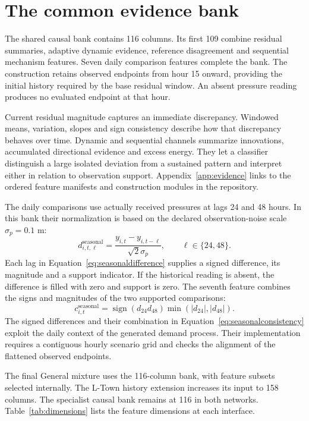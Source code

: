 \section{The common evidence bank}
The shared causal bank contains 116 columns. Its first 109 combine residual summaries, adaptive dynamic evidence, reference disagreement and sequential mechanism features. Seven daily comparison features complete the bank. The construction retains observed endpoints from hour 15 onward, providing the initial history required by the base residual window. An absent pressure reading produces no evaluated endpoint at that hour.

Current residual magnitude captures an immediate discrepancy. Windowed means, variation, slopes and sign consistency describe how that discrepancy behaves over time. Dynamic and sequential channels summarize innovations, accumulated directional evidence and excess energy. They let a classifier distinguish a large isolated deviation from a sustained pattern and interpret either in relation to observation support. Appendix~\ref{app:evidence} links to the ordered feature manifests and construction modules in the repository.

The daily comparisons use actually received pressures at lags 24 and 48 hours. In this bank their normalization is based on the declared observation-noise scale $\sigma_p=0.1$ m:
\begin{equation}
 d^{\mathrm{seasonal}}_{i,t,\ell}=
 \frac{y_{i,t}-y_{i,t-\ell}}{\sqrt{2}\sigma_p},
 \qquad \ell\in\{24,48\}.\label{eq:seasonaldifference}
\end{equation}
Each lag in Equation~\eqref{eq:seasonaldifference} supplies a signed difference, its magnitude and a support indicator. If the historical reading is absent, the difference is filled with zero and support is zero. The seventh feature combines the signs and magnitudes of the two supported comparisons:
\begin{equation}
 c^{\mathrm{seasonal}}_{i,t}=\operatorname{sign}(d_{24}d_{48})
                   \min(|d_{24}|,|d_{48}|).\label{eq:seasonalconsistency}
\end{equation}
The signed differences and their combination in Equation~\eqref{eq:seasonalconsistency} exploit the daily context of the generated demand process. Their implementation requires a contiguous hourly scenario grid and checks the alignment of the flattened observed endpoints.

The final General mixture uses the 116-column bank, with feature subsets selected internally. The L-Town history extension increases its input to 158 columns. The specialist causal bank remains at 116 in both networks. Table~\ref{tab:dimensions} lists the feature dimensions at each interface.

